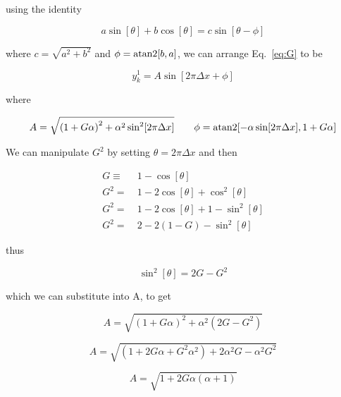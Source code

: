 \documentclass{article}
\begin{document}
\begin{homeworkProblem}
    \noindent using the identity

    \begin{equation}
        a \sin[\theta] + b\cos[\theta] = c \sin[\theta - \phi]
    \end{equation}

    \noindent where $c = \sqrt{a^2 + b^2}$ and $\phi = {\rm atan2}[b,a]$, we
    can arrange Eq.~\ref{eq:G} to be

    \begin{equation}
        y_k^1 = A \sin[2 \pi \Delta x + \phi]
    \end{equation}

    \noindent where

    \begin{equation}
        A = \sqrt{{(1 + G\alpha)}^2 + \alpha^2 \sin^2[2 \pi \Delta x]}
        \,\,\,\,\,\,\,\,\,\,\,\,
        \phi = {\rm atan2}[- \alpha \sin[2 \pi \Delta x ], 1+G \alpha] 
    \end{equation}

    We can manipulate $G^2$ by setting $\theta = 2 \pi \Delta x$ and then

    \begin{align*}
        G \equiv &\ 1 - \cos[\theta] \\
        G^2 = &\ 1 - 2 \cos[\theta] + \cos^2[\theta]  \\
        G^2 = &\ 1 - 2 \cos[\theta] + 1 - \sin^2[\theta]  \\
        G^2 = &\ 2 - 2 (1 - G) - \sin^2[\theta]
    \end{align*}

    \noindent thus

    \begin{equation}\label{eq:sin2g}
        \sin^2[\theta] = 2G - G^2 
    \end{equation}

    \noindent which we can substitute into A, to get 
    
    \begin{equation}
        A = \sqrt{{(1+G\alpha)}^2 + \alpha^2(2G-G^2)}
    \end{equation}
    
    \begin{equation}
        A = \sqrt{{(1+2G\alpha+G^2\alpha^2)} + 2\alpha^2G-\alpha^2G^2}
    \end{equation}
    
    \begin{equation}
        A = \sqrt{1+2G\alpha(\alpha+1)}
    \end{equation}


\end{homeworkProblem}
\end{document}
